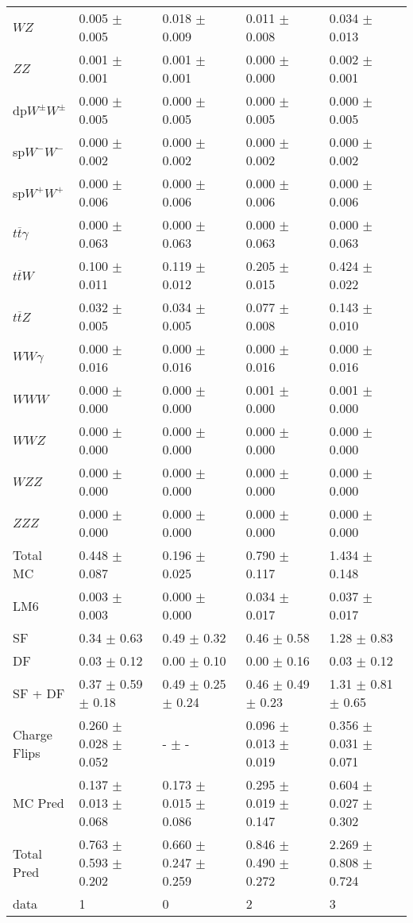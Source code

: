 \begin{tabular}{l | l l l l}
$WZ$ &  0.005 $\pm$  0.005 &  0.018 $\pm$  0.009 &  0.011 $\pm$  0.008 &  0.034 $\pm$  0.013\\
$ZZ$ &  0.001 $\pm$  0.001 &  0.001 $\pm$  0.001 &   0.000 $\pm$   0.000 &  0.002 $\pm$  0.001\\
\hline
dp$W^{\pm}W^{\pm}$ &  0.000 $\pm$  0.005 &  0.000 $\pm$  0.005 &  0.000 $\pm$  0.005 &  0.000 $\pm$  0.005\\
sp$W^{-}W^{-}$ &  0.000 $\pm$  0.002 &  0.000 $\pm$  0.002 &  0.000 $\pm$  0.002 &  0.000 $\pm$  0.002\\
sp$W^{+}W^{+}$ &  0.000 $\pm$  0.006 &  0.000 $\pm$  0.006 &  0.000 $\pm$  0.006 &  0.000 $\pm$  0.006\\
$t\overline{t}\gamma$ &  0.000 $\pm$  0.063 &  0.000 $\pm$  0.063 &  0.000 $\pm$  0.063 &  0.000 $\pm$  0.063\\
$t\overline{t}W$ &  0.100 $\pm$  0.011 &  0.119 $\pm$  0.012 &  0.205 $\pm$  0.015 &  0.424 $\pm$  0.022\\
$t\overline{t}Z$ &  0.032 $\pm$  0.005 &  0.034 $\pm$  0.005 &  0.077 $\pm$  0.008 &  0.143 $\pm$  0.010\\
$WW\gamma$ &  0.000 $\pm$  0.016 &  0.000 $\pm$  0.016 &  0.000 $\pm$  0.016 &  0.000 $\pm$  0.016\\
$WWW$ &  0.000 $\pm$   0.000 &   0.000 $\pm$   0.000 &  0.001 $\pm$   0.000 &  0.001 $\pm$   0.000\\
$WWZ$ &  0.000 $\pm$   0.000 &  0.000 $\pm$   0.000 &  0.000 $\pm$   0.000 &  0.000 $\pm$   0.000\\
$WZZ$ &  0.000 $\pm$   0.000 &   0.000 $\pm$   0.000 &   0.000 $\pm$   0.000 &   0.000 $\pm$   0.000\\
$ZZZ$ &   0.000 $\pm$   0.000 &   0.000 $\pm$   0.000 &   0.000 $\pm$   0.000 &   0.000 $\pm$   0.000\\
\hline
Total MC &  0.448 $\pm$  0.087 &  0.196 $\pm$  0.025 &  0.790 $\pm$  0.117 &  1.434 $\pm$  0.148\\
\hline\hline
\hline
LM6 &  0.003 $\pm$  0.003 &  0.000 $\pm$  0.000 &  0.034 $\pm$  0.017 &  0.037 $\pm$  0.017\\
\hline\hline
\hline\hline
 SF  & 0.34 $\pm$ 0.63 & 0.49 $\pm$ 0.32 & 0.46 $\pm$ 0.58 & 1.28 $\pm$ 0.83\\
 DF  & 0.03 $\pm$ 0.12 & 0.00 $\pm$ 0.10 & 0.00 $\pm$ 0.16 & 0.03 $\pm$ 0.12\\
\hline
 SF + DF  & 0.37 $\pm$ 0.59 $\pm$ 0.18 & 0.49 $\pm$ 0.25 $\pm$ 0.24 & 0.46 $\pm$ 0.49 $\pm$ 0.23 & 1.31 $\pm$ 0.81 $\pm$ 0.65\\
\hline\hline
Charge Flips & 0.260 $\pm$ 0.028 $\pm$ 0.052 & - $\pm$ - & 0.096 $\pm$ 0.013 $\pm$ 0.019 & 0.356 $\pm$ 0.031 $\pm$ 0.071\\
\hline\hline
\hline
MC Pred &  0.137 $\pm$  0.013 $\pm$  0.068 &  0.173 $\pm$  0.015 $\pm$  0.086 &  0.295 $\pm$  0.019 $\pm$  0.147 &  0.604 $\pm$  0.027 $\pm$  0.302\\
\hline\hline
Total Pred &  0.763 $\pm$  0.593 $\pm$  0.202 &  0.660 $\pm$  0.247 $\pm$  0.259 &  0.846 $\pm$  0.490 $\pm$  0.272 &  2.269 $\pm$  0.808 $\pm$  0.724\\
\hline\hline
data & 1 & 0 & 2 & 3\\
\hline\hline
\end{tabular}
